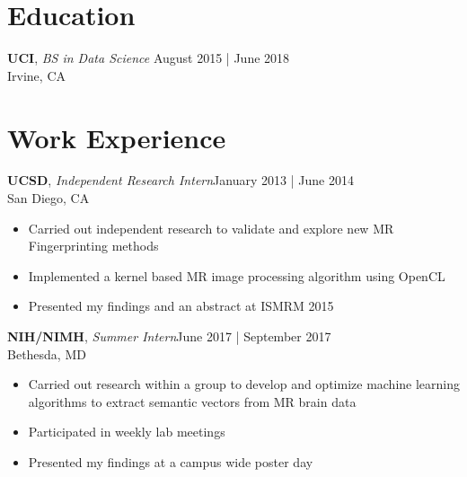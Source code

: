 \documentclass[line,margin]{res}
\begin{document}
\address{maxwell.li.wong@gmail.com | github.com/mwong94 | (858) 431-9185}
\begin{resume}
    \vspace{-5mm}

    \section{Education}
        \textbf{UCI}, {\sl BS in Data Science} \hfill August 2015 | June 2018\\Irvine, CA

    \section{Work Experience}
        \textbf{UCSD}, {\sl Independent Research Intern}\hfill January 2013 | June 2014\\San Diego, CA\\
        \begin{itemize} \itemsep 3pt
            \item Carried out independent research to validate and explore new MR Fingerprinting methods
            \item Implemented a kernel based MR image processing algorithm using OpenCL
            \item Presented my findings and an abstract at ISMRM 2015
            \end{itemize}
            \textbf{NIH/NIMH}, {\sl Summer Intern}\hfill June 2017 | September 2017\\Bethesda, MD\\\begin{itemize} \itemsep 3pt
            \item Carried out research within a group to develop and optimize machine learning algorithms to extract semantic vectors from MR brain data
            \item Participated in weekly lab meetings
            \item Presented my findings at a campus wide poster day
        \end{itemize}


\end{resume}
\end{document}
